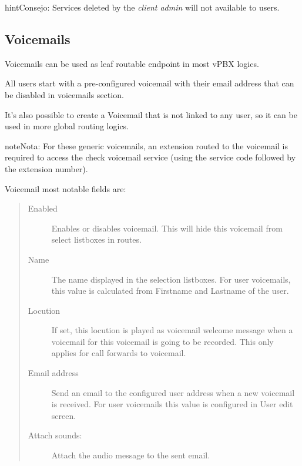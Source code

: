 \documentclass[letterpaper,10pt,spanish]{sphinxmanual}
\begin{document}
\begin{notice}{hint}{Consejo:}
Services deleted by the \emph{client admin} will not available to users.
\end{notice}


\subsection{Voicemails}
\label{administration_portal/client/vpbx/voicemails:voicemails}\label{administration_portal/client/vpbx/voicemails::doc}\label{administration_portal/client/vpbx/voicemails:id1}
Voicemails can be used as leaf routable endpoint in most vPBX logics.

All users start with a pre-configured voicemail with their email address that can be disabled in voicemails section.

It's also possible to create a Voicemail that is not linked to any user, so it can be used in more global routing
logics.

\begin{notice}{note}{Nota:}
For these generic voicemails, an extension routed to the voicemail is required to access the check voicemail
service (using the service code followed by the extension number).
\end{notice}

Voicemail most notable fields are:
\begin{quote}
\begin{description}
\item[{Enabled}] \leavevmode
Enables or disables voicemail. This will hide this voicemail from select listboxes in routes.

\item[{Name}] \leavevmode
The name displayed in the selection listboxes. For user voicemails, this value is calculated from Firstname and
Lastname of the user.

\item[{Locution}] \leavevmode
If set, this locution is played as voicemail welcome message when a voicemail
for this voicemail is going to be recorded. This only applies for call forwards
to voicemail.

\item[{Email address}] \leavevmode
Send an email to the configured user address when a new voicemail is received. For user voicemails this value
is configured in User edit screen.

\item[{Attach sounds:}] \leavevmode
Attach the audio message to the sent email.

\end{description}
\end{quote}
\end{document}
